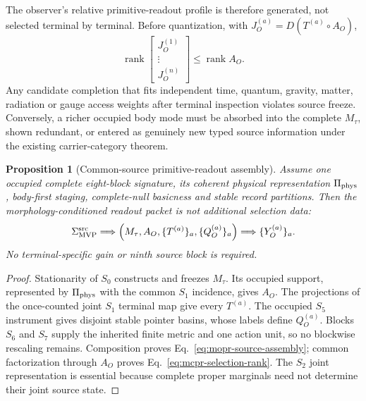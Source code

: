 \documentclass[11pt]{article}
\newtheorem{proposition}{Proposition}
\begin{document}
The observer's relative primitive-readout profile is therefore generated, not
selected terminal by terminal. Before quantization, with
$J_O^{(a)}=D(T^{(a)}\circ A_O)$,
\begin{equation}
 \operatorname{rank}
 \begin{bmatrix}J_O^{(1)}\\ \vdots\\ J_O^{(n)}\end{bmatrix}
 \leq\operatorname{rank}A_O.
 \label{eq:mcpr-selection-rank}
\end{equation}
Any candidate completion that fits independent time, quantum, gravity,
matter, radiation or gauge access weights after terminal inspection violates
source freeze. Conversely, a richer occupied body mode must be absorbed into
the complete $M_\tau$, shown redundant, or entered as genuinely new typed
source information under the existing carrier-category theorem.

\begin{proposition}[Common-source primitive-readout assembly]
\label{prop:mopr-source-assembly}
Assume one occupied complete eight-block signature, its coherent physical
representation $\Pi_{\rm phys}$, body-first staging, complete-null basicness
and stable record partitions. Then the morphology-conditioned readout packet
is not additional selection data:
\begin{equation}
 \Sigma_{\rm MVP}^{\rm src}
 \Longrightarrow
 \left(M_\tau,A_O,\{T^{(a)}\}_a,\{Q_O^{(a)}\}_a\right)
 \Longrightarrow
 \{Y_O^{(a)}\}_a .
 \label{eq:mopr-source-assembly}
\end{equation}
No terminal-specific gain or ninth source block is required.
\end{proposition}

\begin{proof}
Stationarity of $S_0$ constructs and freezes $M_\tau$. Its occupied support,
represented by $\Pi_{\rm phys}$ with the common $S_1$ incidence, gives $A_O$.
The projections of the once-counted joint $S_1$ terminal map give every
$T^{(a)}$. The occupied $S_5$ instrument gives disjoint stable pointer basins,
whose labels define $Q_O^{(a)}$. Blocks $S_6$ and $S_7$ supply the inherited
finite metric and one action unit, so no blockwise rescaling remains.
Composition proves Eq.~\eqref{eq:mopr-source-assembly}; common factorization
through $A_O$ proves Eq.~\eqref{eq:mcpr-selection-rank}. The $S_2$ joint
representation is essential because complete proper marginals need not
determine their joint source state.
\end{proof}
\end{document}
